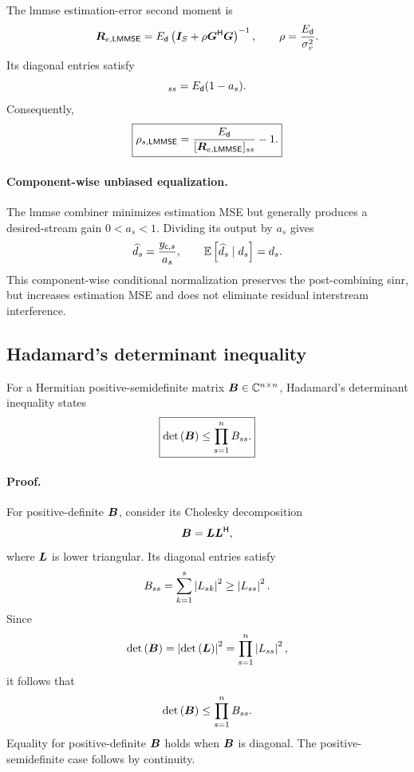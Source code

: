 The \ac{lmmse} estimation-error second moment is
\begin{equation*}
	\bm{R}_{e,\mathsf{LMMSE}}
	=E_{\mathsf{d}}\left(
	\bm{I}_{S}
	+\rho{\bm{G}}^{\mathsf{H}}\bm{G}
	\right)^{-1},
	\qquad
	\rho=\frac{E_{\mathsf{d}}}{\sigma_v^2}.
\end{equation*}
Its diagonal entries satisfy
\begin{equation*}
	[\ma{R}_{e,\LMMSE}]_{ss}
	=\Ed(1-a_s).
\end{equation*}
Consequently,
\begin{equation}\label{eq:app-mmse-sinr}
	\boxed{
		\rho_{s,\mathsf{LMMSE}}
		=
		\frac{E_{\mathsf{d}}}
		{[\bm{R}_{e,\mathsf{LMMSE}}]_{ss}}-1.
	}
\end{equation}

\paragraph{Component-wise unbiased equalization.}
The \ac{lmmse} combiner minimizes estimation MSE
but generally produces a desired-stream gain
$0<a_s<1$. Dividing its output by $a_s$ gives
\begin{equation*}
	\widehat d_s
	=\frac{y_{\mathsf c,s}}{a_s},
	\qquad
	\mathbb{E}\left[\widehat d_s\mid d_s\right]=d_s.
\end{equation*}
This component-wise conditional normalization
preserves the post-combining \ac{sinr}, but
increases estimation MSE and does not eliminate
residual interstream interference.

\subsection{Hadamard's determinant inequality}
\label{app:hadamard}

For a Hermitian positive-semidefinite matrix
$\bm{B}\in\mathbb{C}^{n\times n}$,
Hadamard's determinant inequality states
\begin{equation}\label{eq:app-hadamard}
	\boxed{
		\operatorname{det}\left(\bm{B}\right)
		\leq\prod_{s=1}^{n}B_{ss}.
	}
\end{equation}

\paragraph{Proof.}
For positive-definite $\bm{B}$, consider its
Cholesky decomposition
\begin{equation*}
	\bm{B}=\bm{L}{\bm{L}}^{\mathsf{H}},
\end{equation*}
where $\bm{L}$ is lower triangular.
Its diagonal entries satisfy
\begin{equation*}
	B_{ss}
	=\sum_{k=1}^{s}\left|L_{sk}\right|^2
	\geq\left|L_{ss}\right|^2.
\end{equation*}
Since
\begin{equation*}
	\operatorname{det}\left(\bm{B}\right)
	=\left|\operatorname{det}\left(\bm{L}\right)\right|^2
	=\prod_{s=1}^{n}\left|L_{ss}\right|^2,
\end{equation*}
it follows that
\begin{equation*}
	\operatorname{det}\left(\bm{B}\right)
	\leq\prod_{s=1}^{n}B_{ss}.
\end{equation*}
Equality for positive-definite $\bm{B}$ holds
when $\bm{B}$ is diagonal.
The positive-semidefinite case follows by continuity.

